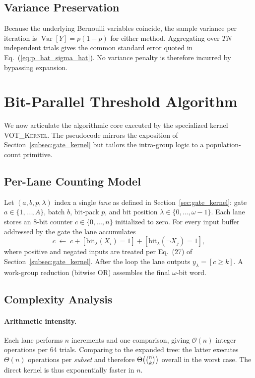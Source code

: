 \subsection{Variance Preservation}
\label{sec:voter_variance}

Because the underlying Bernoulli variables coincide, the sample variance per
iteration is
\(
  \operatorname{Var}[Y] = p(1-p)
\)
for either method.  Aggregating over $T N$ independent trials gives the common
standard error quoted in Eq.~(\ref{eq:p_hat_sigma_hat}).  No variance penalty
is therefore incurred by bypassing expansion.

\section{Bit-Parallel Threshold Algorithm}
\label{sec:voter_algorithm}

We now articulate the algorithmic core executed by the specialized kernel
\textsc{VOT\_Kernel}.  The pseudocode mirrors the exposition of
Section~\ref{subsec:gate_kernel} but tailors the intra-group logic to a
population-count primitive.

\subsection{Per-Lane Counting Model}

Let $(a,b,p,\lambda)$ index a single \emph{lane} as defined in
Section~\ref{sec:gate_kernel}: gate $a\in\{1,\dots,A\}$, batch $b$, bit-pack
$p$, and bit position $\lambda\in\{0,\dots,\omega-1\}$.  Each lane stores an
8-bit counter $c\in\{0,\dots,n\}$ initialized to zero.  For every input buffer
addressed by the gate the lane accumulates
\[
  c\;\leftarrow\;c + [\text{bit}_{\lambda}(X_i)=1] + [\text{bit}_{\lambda}(\lnot X_j)=1],
\]
where positive and negated inputs are treated per
Eq.~(27) of Section~\ref{subsec:gate_kernel}.  After the loop the lane outputs
\(
  y_{\lambda} = [c\ge k].
\)
A work-group reduction (bitwise OR) assembles the final $\omega$-bit word.

\subsection{Complexity Analysis}
\label{sec:voter_complexity}

\paragraph{Arithmetic intensity.}  Each lane performs $n$ increments and one
comparison, giving $\mathcal{O}(n)$ integer operations per 64 trials.
Comparing to the expanded tree: the latter executes $\Theta(n)$ operations per
\emph{subset} and therefore $\Theta\bigl(\tbinom{n}{k}\bigr)$ overall in the
worst case.  The direct kernel is thus exponentially faster in $n$.

